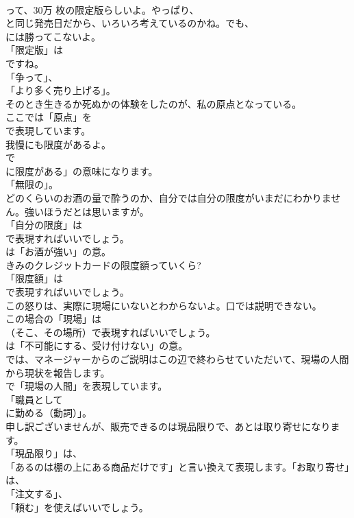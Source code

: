 \documentclass[8pt]{extreport}
\begin{document}
\begin{CJK}{UTF8}{min}
\\	って、30万 枚の限定版らしいよ。やっぱり、
\\	と同じ発売日だから、いろいろ考えているのかね。でも、
\\	には勝ってこないよ。 
\\	「限定版」は
\\	ですね。
\\	「争って」、
\\	「より多く売り上げる」。	
\\	そのとき生きるか死ぬかの体験をしたのが、私の原点となっている。 
\\	ここでは「原点」を
\\	で表現しています。	
\\	我慢にも限度があるよ。 
\\	で
\\	に限度がある」の意味になります。
\\	「無限の」。	
\\	どのくらいのお酒の量で酔うのか、自分では自分の限度がいまだにわかりません。強いほうだとは思いますが。 
\\	「自分の限度」は 
\\	で表現すればいいでしょう。
\\	は「お酒が強い」の意。	
\\	きみのクレジットカードの限度額っていくら? 
\\	「限度額」は 
\\	で表現すればいいでしょう。	
\\	この怒りは、実際に現場にいないとわからないよ。口では説明できない。 
\\	この場合の「現場」は 
\\	（そこ、その場所）で表現すればいいでしょう。
\\	は「不可能にする、受け付けない」の意。	
\\	では、マネージャーからのご説明はこの辺で終わらせていただいて、現場の人間から現状を報告します。 
\\	で「現場の人間」を表現しています。
\\	「職員として 
\\	に勤める（動詞）」。	
\\	申し訳ございませんが、販売できるのは現品限りで、あとは取り寄せになります。 
\\	「現品限り」は、
\\	「あるのは棚の上にある商品だけです」と言い換えて表現します。「お取り寄せ」は、
\\	「注文する」、
\\	「頼む」を使えばいいでしょう。	

\end{CJK}
\end{document}
